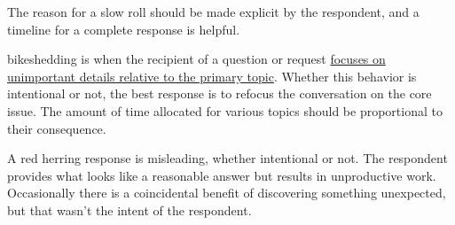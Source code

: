 The reason for a slow roll should be made explicit by the respondent, 
and a timeline for a complete response is helpful. 


\Gls{bikeshedding} 
is when the recipient of a question or request \href{https://en.wikipedia.org/wiki/Law_of_triviality}{focuses on unimportant details relative to the primary topic}. 
Whether this behavior is intentional or not, the best response is to refocus the conversation on the core issue. The amount of time allocated for various topics should be proportional to their consequence. 

A \gls{red herring}
response is misleading, whether intentional or not. The respondent provides what looks like a reasonable answer but results in unproductive work. Occasionally there is a coincidental benefit of discovering something unexpected, but that wasn't the intent of the respondent. 
